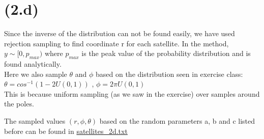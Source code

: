 \section{(2.d)}
Since the inverse of the distribution can not be found easily, we have used rejection sampling to find coordinate r for each satellite. In the method, $y \sim [0, p_{max})$ where $p_{max}$ is the peak value of the probability distribution and is found analytically.\\
Here we also sample $\theta$ and $\phi$ based on the distribution seen in exercise class:\\
$\theta= cos^{-1}(1-2U(0,1))$ , $\phi= 2\pi U(0,1)$\\
This is because uniform sampling (as we saw in the exercise) over samples around the poles.



The sampled values $(r, \phi, \theta)$ based on the random parameters a, b and c listed before can be found in  \url{satellites_2d.txt}